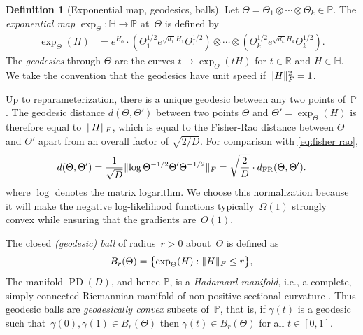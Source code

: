 \documentclass[aos]{imsart}
\theoremstyle{definition}
\newtheorem{definition}[theorem]{Definition}
\numberwithin{equation}{section}
\DeclareMathOperator{\PD}{PD}
\DeclarePairedDelimiter{\norm}{\lVert}{\rVert}
\newcommand{\R}{{\mathbb{R}}}
\renewcommand{\P}{{\mathbb{P}}}
\renewcommand{\H}{{\mathbb{H}}}
\newcommand{\ot}{\otimes}
\newcommand{\dFR}{d_{\operatorname{FR}}}
\begin{document}
\begin{definition}[Exponential map, geodesics, balls]
Let $\Theta=\Theta_1\ot\cdots\ot\Theta_k\in\P$.
The \emph{exponential map} $\exp_\Theta \colon \H \to \P$ at~$\Theta$ is defined by
\begin{align*}
  \exp_\Theta(H)
&= e^{H_0} \cdot ( \Theta_1^{1/2} e^{\sqrt{d_1} H_1} \Theta_1^{1/2}) \ot \cdots \ot (\Theta_k^{1/2} e^{\sqrt{d_k} H_k} \Theta_k^{1/2}).
\end{align*}
The \emph{geodesics} through $\Theta$ are the curves $t \mapsto \exp_\Theta(t H)$ for $t\in\R$ and $H\in\H$.
We take the convention that the geodesics have unit speed if $\norm{H}_F^2 = 1$.

Up to reparameterization, there is a unique geodesic between any two points of~$\P$.
The geodesic distance $d(\Theta,\Theta')$ between two points $\Theta$ and $\Theta'=\exp_\Theta(H)$ is therefore equal to~$\norm H_F$, which is equal to the Fisher-Rao distance between $\Theta$ and $\Theta'$ apart from an overall factor of $\sqrt{2/D}$.
For comparison with \cref{eq:fisher rao},
\begin{align}\label{eq:fisher-vs-geo}
  d(\Theta,\Theta') = \frac1{\sqrt D} \norm{\log \Theta^{-1/2} \Theta' \Theta^{-1/2}}_F = \sqrt{\frac{2}{D}} \cdot \dFR(\Theta, \Theta').
\end{align}
where $\log$ denotes the matrix logarithm.
We choose this normalization because it will make the negative log-likelihood functions typically~$\Omega(1)$ strongly convex while ensuring that the gradients are~$O(1)$.

The closed \emph{(geodesic) ball} of radius~$r>0$ about~$\Theta$ is defined as
\begin{align*}
  B_r(\Theta) = \bigl\{ \exp_\Theta(H) : \norm H_F \leq r \bigr\},
\end{align*}
The manifold $\PD(D)$, and hence $\P$, is a \emph{Hadamard manifold}, i.e., a complete, simply connected Riemannian manifold of non-positive sectional curvature \citep{bacak2014convex}. Thus geodesic balls are \emph{geodesically convex} subsets of~$\P$, that is, if $\gamma(t)$ is a geodesic such that~$\gamma(0),\gamma(1) \in B_r(\Theta)$ then $\gamma(t) \in B_r(\Theta)$ for all $t\in[0,1]$.
\end{definition}
\end{document}
